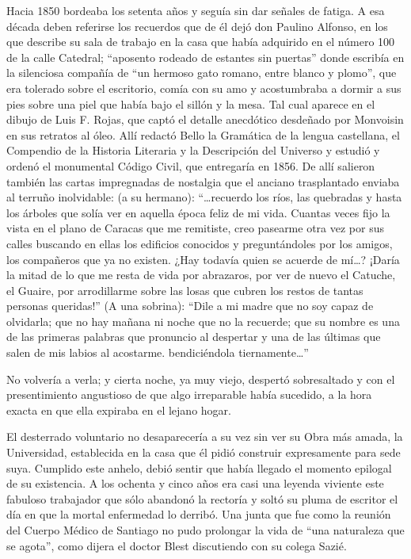 \documentclass[10pt,twoside,openright]{memoir}
\begin{document}
Hacia 1850 bordeaba los setenta años y seguía sin dar señales de fatiga.
A esa década deben referirse los recuerdos que de él dejó don Paulino
Alfonso, en los que describe su sala de trabajo en la casa que había
adquirido en el número 100 de la calle Catedral; ``aposento rodeado de
estantes sin puertas'' donde escribía en la silenciosa compañía de ``un
hermoso gato romano, entre blanco y plomo'', que era tolerado sobre el
escritorio, comía con su amo y acostumbraba a dormir a sus pies sobre
una piel que había bajo el sillón y la mesa. Tal cual aparece en el
dibujo de Luis F. Rojas, que captó el detalle anecdótico desdeñado por
Monvoisin en sus retratos al óleo. Allí redactó Bello la Gramática de la
lengua castellana, el Compendio de la Historia Literaria y la
Descripción del Universo y estudió y ordenó el monumental Código Civil,
que entregaría en 1856. De allí salieron también las cartas impregnadas
de nostalgia que el anciano trasplantado enviaba al terruño inolvidable:
(a su hermano): ``\ldots recuerdo los ríos, las quebradas y hasta los árboles
que solía ver en aquella época feliz de mi vida. Cuantas veces fijo la
vista en el plano de Caracas que me remitiste, creo pasearme otra vez
por sus calles buscando en ellas los edificios conocidos y
preguntándoles por los amigos, los compañeros que ya no existen. ¿Hay
todavía quien se acuerde de mí\ldots? ¡Daría la mitad de lo que me resta de
vida por abrazaros, por ver de nuevo el Catuche, el Guaire, por
arrodillarme sobre las losas que cubren los restos de tantas personas
queridas!'' (A una sobrina): ``Dile a mi madre que no soy capaz de
olvidarla; que no hay mañana ni noche que no la recuerde; que su nombre
es una de las primeras palabras que pronuncio al despertar y una de las
últimas que salen de mis labios al acostarme. bendiciéndola
tiernamente\ldots''

No volvería a verla; y cierta noche, ya muy viejo, despertó sobresaltado
y con el presentimiento angustioso de que algo irreparable había
sucedido, a la hora exacta en que ella expiraba en el lejano hogar.

El desterrado voluntario no desaparecería a su vez sin ver su Obra más
amada, la Universidad, establecida en la casa que él pidió construir
expresamente para sede suya. Cumplido este anhelo, debió sentir que
había llegado el momento epilogal de su existencia. A los ochenta y
cinco años era casi una leyenda viviente este fabuloso trabajador que
sólo abandonó la rectoría y soltó su pluma de escritor el día en que la
mortal enfermedad lo derribó. Una junta que fue como la reunión del
Cuerpo Médico de Santiago no pudo prolongar la vida de ``una naturaleza
que se agota'', como dijera el doctor Blest discutiendo con su colega
Sazié.
\end{document}
